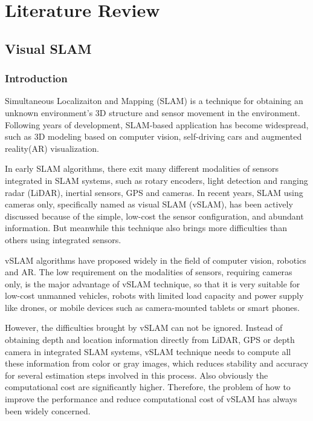 
\chapter{Literature Review}

\section{Visual SLAM}

\subsection{Introduction}
Simultaneous Localizaiton and Mapping (SLAM) is a technique for obtaining an unknown environment's 3D structure and sensor movement in the environment. Following years of development, SLAM-based application has become widespread, such as 3D modeling based on computer vision, self-driving cars and augmented reality(AR) visualization. 

In early SLAM algorithms, there exit many different modalities of sensors integrated in SLAM systems, such as rotary encoders, light detection and ranging radar (LiDAR), inertial sensors, GPS and cameras. In recent years, SLAM using cameras only,  specifically named as visual SLAM (vSLAM), has been actively discussed because of the simple, low-cost the sensor configuration, and  abundant information. But meanwhile this technique also brings more difficulties than others using integrated sensors\cite{taketomi2017visual}. 

vSLAM algorithms have proposed widely in the field of computer vision, robotics and AR. The low requirement on the modalities of sensors, requiring cameras only, is the major advantage of vSLAM technique, so that it is very suitable for low-cost unmanned vehicles, robots with limited load capacity and power supply like drones, or mobile devices such as camera-mounted tablets or smart phones.

However, the difficulties brought by vSLAM can not be ignored. Instead of obtaining depth and location information directly from LiDAR, GPS or depth camera in integrated SLAM systems, vSLAM technique needs to compute all these information from color or gray images, which reduces stability and accuracy for several estimation steps involved in this process. Also obviously the computational cost are significantly higher. Therefore, the problem of how to improve the performance and reduce computational cost of vSLAM has always been widely concerned.



